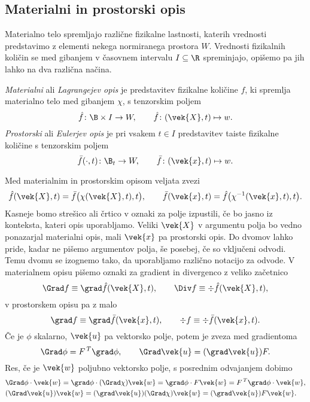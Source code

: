 \subsection{Materialni in prostorski opis}


Materialno telo spremljajo različne fizikalne lastnosti, katerih vrednosti predstavimo z elementi nekega
normiranega prostora $W$. Vrednosti fizikalnih količin
se med gibanjem v časovnem intervalu $I\subseteq\R$ spreminjajo, opišemo pa jih lahko na
dva različna načina.
\begin{definicija}
	\emph{Materialni} ali \emph{Lagrangejev opis} je predstavitev fizikalne količine $f$, ki spremlja materialno telo
	med gibanjem $\chi$, s tenzorskim poljem
	\[ \hat{f}\colon\B\times I \to W, \qquad \hat{f}\colon (\vek{X},t)\mapsto w. \]
	\emph{Prostorski} ali \emph{Eulerjev opis} je pri vsakem $t\in I$ predstavitev taiste fizikalne količine s tenzorskim poljem
	\[ \bar{f}(\cdot,t)\colon\B_t\to W, \qquad \bar{f}\colon (\vek{x},t)\mapsto w. \]
\end{definicija}
Med materialnim in prostorskim opisom veljata zvezi
\begin{equation}\label{e:mpo-zveza}
	\hat{f}(\vek{X},t) = \bar{f}\big(\chi(\vek{X},t),t\big),\qquad \bar{f}(\vek{x},t) = \hat{f}\big(\chi^{-1}(\vek{x},t),t\big).
\end{equation}
Kasneje bomo strešico ali črtico v oznaki za polje izpustili, če bo jasno iz konteksta, kateri opis uporabljamo.
Veliki $\vek{X}$ v argumentu polja bo vedno ponazarjal materialni opis, mali $\vek{x}$ pa prostorski opis.
Do dvomov lahko pride, kadar ne pišemo argumentov polja, še posebej, če so vključeni odvodi. Temu dvomu se izognemo tako,
da uporabljamo različno notacijo za odvode. V materialnem opisu pišemo oznaki za gradient in divergenco z
veliko začetnico
\[ \Grad f\equiv\grad \hat{f}(\vek{X},t),\qquad \Div f \equiv \div \hat{f}(\vek{X},t), \]
v prostorskem opisu pa z malo
\[ \grad f\equiv\grad \bar{f}(\vek{x},t),\qquad \div f \equiv \div \bar{f}(\vek{x},t). \]
Če je $\phi$ skalarno, $\vek{u}$ pa vektorsko polje, potem je zveza med gradientoma
\begin{equation}\label{e:gz}
	\Grad\phi=F^{\,T}\grad\phi,\qquad \Grad\vek{u}=(\grad\vek{u})F.
\end{equation}
Res, če je $\vek{w}$ poljubno vektorsko polje, s posrednim odvajanjem dobimo
\begin{align*}
	&\Grad\phi\cdot\vek{w}=\grad\phi\cdot(\Grad\chi)\vek{w}=
	\grad\phi\cdot F\vek{w}=F^{\,T}\grad\phi\cdot\vek{w}, \\
	&(\Grad\vek{u})\vek{w}=(\grad\vek{u})(\Grad\chi)\vek{w}
	=(\grad\vek{u})F\vek{w}.
\end{align*}

